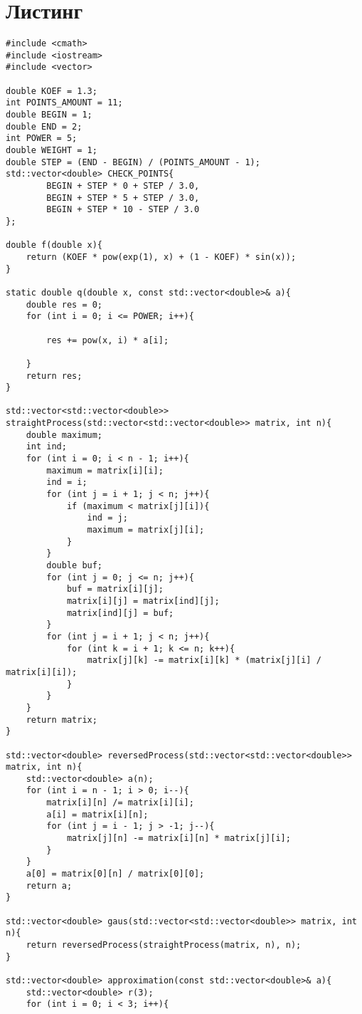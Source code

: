 \documentclass[10pt]{scrartcl}
\makeatletter
\newcommand{\verbatimfont}[1]{\renewcommand{\verbatim@font}{\ttfamily#1}}
\makeatother
\begin{document}
\section*{Листинг}
\verbatimfont{\small}
\begin{verbatim}
#include <cmath>
#include <iostream>
#include <vector>

double KOEF = 1.3;
int POINTS_AMOUNT = 11;
double BEGIN = 1;
double END = 2;
int POWER = 5;
double WEIGHT = 1;
double STEP = (END - BEGIN) / (POINTS_AMOUNT - 1);
std::vector<double> CHECK_POINTS{
        BEGIN + STEP * 0 + STEP / 3.0,
        BEGIN + STEP * 5 + STEP / 3.0,
        BEGIN + STEP * 10 - STEP / 3.0
};

double f(double x){
    return (KOEF * pow(exp(1), x) + (1 - KOEF) * sin(x));
}

static double q(double x, const std::vector<double>& a){
    double res = 0;
    for (int i = 0; i <= POWER; i++){

        res += pow(x, i) * a[i];

    }
    return res;
}

std::vector<std::vector<double>> straightProcess(std::vector<std::vector<double>> matrix, int n){
    double maximum;
    int ind;
    for (int i = 0; i < n - 1; i++){
        maximum = matrix[i][i];
        ind = i;
        for (int j = i + 1; j < n; j++){
            if (maximum < matrix[j][i]){
                ind = j;
                maximum = matrix[j][i];
            }
        }
        double buf;
        for (int j = 0; j <= n; j++){
            buf = matrix[i][j];
            matrix[i][j] = matrix[ind][j];
            matrix[ind][j] = buf;
        }
        for (int j = i + 1; j < n; j++){
            for (int k = i + 1; k <= n; k++){
                matrix[j][k] -= matrix[i][k] * (matrix[j][i] / matrix[i][i]);
            }
        }
    }
    return matrix;
}

std::vector<double> reversedProcess(std::vector<std::vector<double>> matrix, int n){
    std::vector<double> a(n);
    for (int i = n - 1; i > 0; i--){
        matrix[i][n] /= matrix[i][i];
        a[i] = matrix[i][n];
        for (int j = i - 1; j > -1; j--){
            matrix[j][n] -= matrix[i][n] * matrix[j][i];
        }
    }
    a[0] = matrix[0][n] / matrix[0][0];
    return a;
}

std::vector<double> gaus(std::vector<std::vector<double>> matrix, int n){
    return reversedProcess(straightProcess(matrix, n), n);
}

std::vector<double> approximation(const std::vector<double>& a){
    std::vector<double> r(3);
    for (int i = 0; i < 3; i++){


\end{verbatim}
\end{document}

